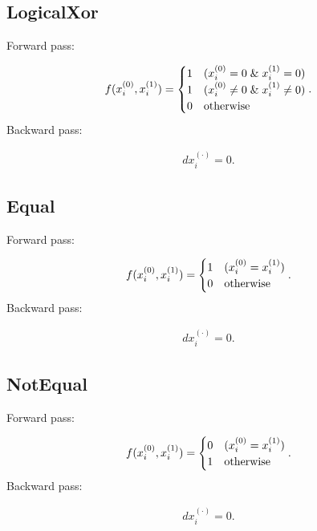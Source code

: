 \documentclass{article}
\begin{document}
\subsection{LogicalXor}

Forward pass:

\begin{eqnarray}
  f(x^{(0)}_i,x^{(1)}_i) = \begin{cases}
    1 & (x^{(0)}_i = 0 \;\&\; x^{(1)}_i = 0) \\
    1 & (x^{(0)}_i \neq 0 \;\&\; x^{(1)}_i \neq 0) \\
    0 & {\rm otherwise}
  \end{cases}.
\end{eqnarray}
%
Backward pass:

\begin{eqnarray}
  dx^{(\cdot)}_i = 0.
\end{eqnarray}

\subsection{Equal}

Forward pass:

\begin{eqnarray}
  f(x^{(0)}_i,x^{(1)}_i) = \begin{cases}
    1 & (x^{(0)}_i = x^{(1)}_i) \\
    0 & {\rm otherwise}
  \end{cases}.
\end{eqnarray}
%
Backward pass:

\begin{eqnarray}
  dx^{(\cdot)}_i = 0.
\end{eqnarray}

\subsection{NotEqual}

Forward pass:

\begin{eqnarray}
  f(x^{(0)}_i,x^{(1)}_i) = \begin{cases}
    0 & (x^{(0)}_i = x^{(1)}_i) \\
    1 & {\rm otherwise}
  \end{cases}.
\end{eqnarray}
%
Backward pass:

\begin{eqnarray}
  dx^{(\cdot)}_i = 0.
\end{eqnarray}
\end{document}
